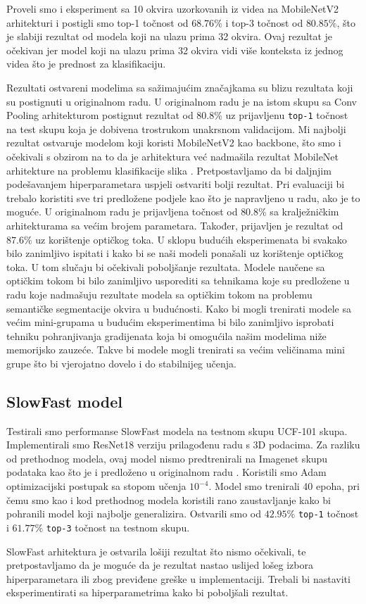 \documentclass[times, utf8, diplomski,  numeric]{fer}
\begin{document}
\par
Proveli smo i eksperiment sa 10 okvira uzorkovanih iz videa na MobileNetV2 arhitekturi i postigli smo top-1 točnost od $68.76\%$ i top-3 točnost od $80.85\%$, što je slabiji rezultat od modela koji na ulazu prima 32 okvira. Ovaj rezultat je očekivan jer model koji na ulazu prima 32 okvira vidi više konteksta iz jednog videa što je prednost za klasifikaciju.
\par
Rezultati ostvareni modelima sa sažimajućim značajkama su blizu rezultata koji su postignuti u originalnom radu. U originalnom radu je na istom skupu sa Conv Pooling arhitekturom postignut rezultat od 80.8\% uz prijavljenu \verb|top-1| točnost na test skupu koja je dobivena trostrukom unakrsnom validacijom. Mi najbolji rezultat ostvaruje modelom koji koristi MobileNetV2 kao backbone, što smo i očekivali s obzirom na to da je arhitektura već nadmašila rezultat MobileNet arhitekture na problemu klasifikacije slika \cite{mobilenetv2}. Pretpostavljamo da bi daljnjim podešavanjem hiperparametara uspjeli ostvariti bolji rezultat. Pri evaluaciji bi trebalo koristiti sve tri predložene podjele kao što je napravljeno u radu, ako je to moguće. U originalnom radu je prijavljena točnost od $80.8\%$ sa kralježničkim arhitekturama sa većim brojem parametara. Također, prijavljen je rezultat od $87.6\%$ uz korištenje optičkog toka. U sklopu budućih eksperimenata bi svakako bilo zanimljivo ispitati i kako bi se naši modeli ponašali uz korištenje optičkog toka. U tom slučaju bi očekivali poboljšanje rezultata. Modele naučene sa optičkim tokom bi bilo zanimljivo usporediti sa tehnikama koje su predložene u radu \cite{saric20cvpr} koje nadmašuju rezultate modela sa optičkim tokom na problemu semantičke segmentacije okvira u budućnosti. Kako bi mogli trenirati modele sa većim mini-grupama u budućim eksperimentima bi bilo zanimljivo isprobati tehniku pohranjivanja gradijenata koja bi omogućila našim modelima niže memorijsko zauzeće. Takve bi modele mogli trenirati sa većim veličinama mini grupe što bi vjerojatno dovelo i do stabilnijeg učenja.
\subsection{SlowFast model}
Testirali smo performanse SlowFast modela na testnom skupu UCF-101 skupa. Implementirali smo ResNet18 verziju prilagođenu radu s 3D podacima. Za razliku od prethodnog modela, ovaj model nismo predtrenirali na Imagenet skupu podataka kao što je i predloženo u originalnom radu \cite{slow-fast}.  Koristili smo Adam optimizacijski postupak sa stopom učenja $10^{-4}$. Model smo trenirali 40 epoha, pri čemu smo kao i kod prethodnog modela koristili rano zaustavljanje kako bi pohranili model koji najbolje generalizira. Ostvarili smo od $42.95\%$ \verb|top-1| točnost i $61.77\%$ \verb|top-3| točnost na testnom skupu.
\par
SlowFast arhitektura je ostvarila lošiji rezultat što nismo očekivali, te pretpostavljamo da je moguće da je rezultat nastao uslijed lošeg izbora hiperparametara ili zbog previđene greške u implementaciji. Trebali bi nastaviti eksperimentirati sa hiperparametrima kako bi poboljšali rezultat.
\end{document}
